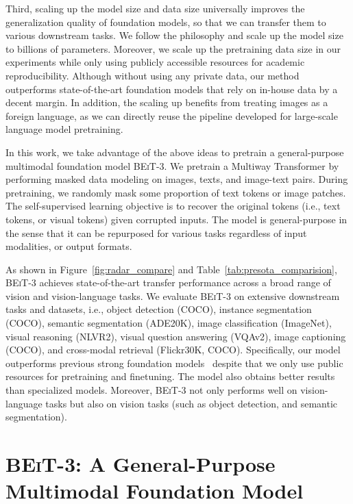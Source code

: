 \documentclass{article}
\newcommand\our{\textsc{BEiT-3}}
\begin{document}
Third, scaling up the model size and data size universally improves the generalization quality of foundation models, so that we can transfer them to various downstream tasks.
We follow the philosophy and scale up the model size to billions of parameters.
Moreover, we scale up the pretraining data size in our experiments while only using publicly accessible resources for academic reproducibility.
Although without using any private data, our method outperforms state-of-the-art foundation models that rely on in-house data by a decent margin.
In addition, the scaling up benefits from treating images as a foreign language, as we can directly reuse the pipeline developed for large-scale language model pretraining.

In this work, we take advantage of the above ideas to pretrain a general-purpose multimodal foundation model \our{}.
We pretrain a Multiway Transformer by performing masked data modeling on images, texts, and image-text pairs.
During pretraining, we randomly mask some proportion of text tokens or image patches. The self-supervised learning objective is to recover the original tokens (i.e., text tokens, or visual tokens) given corrupted inputs.
The model is general-purpose in the sense that it can be repurposed for various tasks regardless of input modalities, or output formats.

As shown in Figure~\ref{fig:radar_compare} and Table~\ref{tab:presota_comparision}, \our{} achieves state-of-the-art transfer performance across a broad range of vision and vision-language tasks.
We evaluate \our{} on extensive downstream tasks and datasets, i.e., object detection (COCO), instance segmentation (COCO), semantic segmentation (ADE20K), image classification (ImageNet), visual reasoning (NLVR2), visual question answering (VQAv2), image captioning (COCO), and cross-modal retrieval (Flickr30K, COCO).
Specifically, our model outperforms previous strong foundation models~\citep{coca,flamingo,florence} despite that we only use public resources for pretraining and finetuning.
The model also obtains better results than specialized models.
Moreover, \our{} not only performs well on vision-language tasks but also on vision tasks (such as object detection, and semantic segmentation).


\section{\our{}: A General-Purpose Multimodal Foundation Model}
\label{sec:methods}
\end{document}
